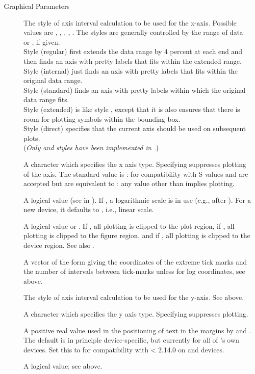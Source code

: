 \begin{Section}{Graphical Parameters}
\begin{description}
\item[] The style of axis interval calculation to be used
for the x-axis.  Possible values are , ,
, , .  The styles are generally
controlled by the range of data or , if given.\\{}
Style  (regular) first extends the data range by 4
percent at each end and then finds an axis with pretty labels
that fits within the extended range.\\{}
Style  (internal) just finds an axis with pretty labels
that fits within the original data range.\\{}
Style  (standard) finds an axis with pretty labels
within which the original data range fits.\\{}
Style  (extended) is like style , except that
it is also ensures that there is room for plotting symbols within
the bounding box.\\{}
Style  (direct) specifies that the current axis should
be used on subsequent plots.\\{}
(\emph{Only  and  styles have been
implemented in \R{}.})
\item[] A character which specifies the x axis type.
Specifying  suppresses plotting of the axis.  The
standard value is : for compatibility with S values
 and  are accepted but are equivalent to
: any value other than  implies plotting.
\item[] A logical value (see  in
).  If , a logarithmic scale
is in use (e.g., after ).
For a new device, it defaults to , i.e., linear scale.
\item[] A logical value or .
If , all plotting is clipped to the plot region, if
, all plotting is clipped to the figure region, and if
, all plotting is clipped to the device region.  See also
.
\item[] A vector of the form  giving
the coordinates of the extreme tick marks and the number of
intervals between tick-marks unless for log coordinates, see
 above.
\item[] The style of axis interval calculation to be used
for the y-axis.  See  above.
\item[] A character which specifies the y axis type.
Specifying  suppresses plotting.
\item[] A positive real value used in the positioning
of text in the margins by  and
.  The default is in principle device-specific,
but currently  for all of \R{}'s own devices.  Set this to
 for compatibility with \R{} < 2.14.0 on  and
 devices.
\item[] A logical value; see  above.


\end{description}
\end{Section}
